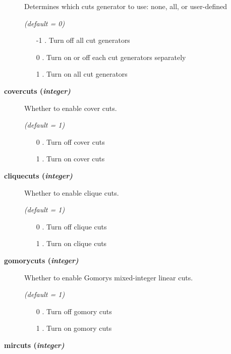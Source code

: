 \begin{description}
Determines which cuts generator to use: none, all, or user-defined

\textsl{(default = 0)}
\begin{itemize}
\item[-1] .
Turn off all cut generators
\item[0] .
Turn on or off each cut generators separately
\item[1] .
Turn on all cut generators
\end{itemize}

\item[\label{glpkcovercuts}\hypertarget{glpkcovercuts}
{\textbf{covercuts (\slshape{integer})}}]\hspace{1.0in}

Whether to enable cover cuts.

\textsl{(default = 1)}
\begin{itemize}
\item[0] .
Turn off cover cuts
\item[1] .
Turn on cover cuts
\end{itemize}

\item[\label{glpkcliquecuts}\hypertarget{glpkcliquecuts}
{\textbf{cliquecuts (\slshape{integer})}}]\hspace{1.0in}

Whether to enable clique cuts.

\textsl{(default = 1)}
\begin{itemize}
\item[0] .
Turn off clique cuts
\item[1] .
Turn on clique cuts
\end{itemize}

\item[\label{glpkgomorycuts}\hypertarget{glpkgomorycuts}
{\textbf{gomorycuts (\slshape{integer})}}]\hspace{1.0in}

Whether to enable Gomorys mixed-integer linear cuts.

\textsl{(default = 1)}
\begin{itemize}
\item[0] .
Turn off gomory cuts
\item[1] .
Turn on gomory cuts
\end{itemize}

\item[\label{glpkmircuts}\hypertarget{glpkmircuts}
{\textbf{mircuts (\slshape{integer})}}]\hspace{1.0in}


\end{description}
